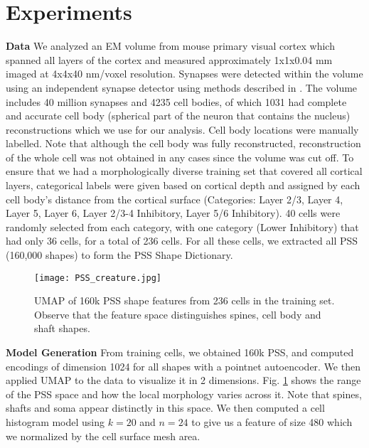 \documentclass[runningheads]{llncs}
\begin{document}
\section{Experiments}
\label{sec:pagestyle}
\noindent \textbf{Data} We analyzed an EM volume from mouse primary visual cortex which spanned all layers of the cortex and measured approximately 1x1x0.04 mm imaged at 4x4x40 nm/voxel resolution. Synapses were detected within the volume using an independent synapse detector using methods described in \cite{synapsedetection}. The volume includes 40 million synapses and 4235 cell bodies, of which 1031 had complete and accurate cell body (spherical part of the neuron that contains the nucleus) reconstructions which we use for our analysis. Cell body locations were manually labelled. Note that although the cell body was fully reconstructed, reconstruction of the whole cell was not obtained in any cases since the volume was cut off.
% 
To ensure that we had a morphologically diverse training set that covered all cortical layers, categorical labels were given based on cortical depth and assigned by each cell body's distance from the cortical surface (Categories: Layer 2/3, Layer 4, Layer 5, Layer 6, Layer 2/3-4 Inhibitory, Layer 5/6 Inhibitory). 40 cells were randomly selected from each category, with one category (Lower Inhibitory) that had only 36 cells, for a total of 236 cells. 
For all these cells, we extracted all PSS (160,000 shapes) to form the PSS Shape Dictionary.

\begin{figure}[t]
    \centering
    \texttt{[image: PSS\_creature.jpg]}
    \caption{UMAP of 160k PSS shape features from 236 cells in the training set. Observe that the feature space distinguishes spines, cell body and shaft shapes.}
    \label{fig:umapspines}
\end{figure}
\noindent \textbf{Model Generation}
From training cells, we obtained 160k PSS, and computed encodings of dimension 1024 for all shapes with a pointnet autoencoder. We then applied UMAP \cite{2018arXivUMAP} to the data to visualize it in 2 dimensions. Fig. \ref{fig:umapspines} shows the range of the PSS space and how the local morphology varies across it. Note that spines, shafts and soma appear distinctly in this space.
We then computed a cell histogram model using $k = 20$ and $n = 24$ to give us a feature of size 480 which we normalized by the cell surface mesh area. 
\end{document}
